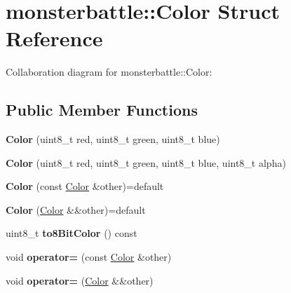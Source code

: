 \hypertarget{structmonsterbattle_1_1Color}{}\section{monsterbattle\+:\+:Color Struct Reference}
\label{structmonsterbattle_1_1Color}


Collaboration diagram for monsterbattle\+:\+:Color\+:
\subsection*{Public Member Functions}
\begin{DoxyCompactItemize}
\item 
\mbox{\label{structmonsterbattle_1_1Color_a99ad4b64f0358401ea1e0d097c207997}} 
{\bfseries Color} (uint8\+\_\+t red, uint8\+\_\+t green, uint8\+\_\+t blue)
\item 
\mbox{\label{structmonsterbattle_1_1Color_a1c13658e34dafb56224fdc52fdecee2e}} 
{\bfseries Color} (uint8\+\_\+t red, uint8\+\_\+t green, uint8\+\_\+t blue, uint8\+\_\+t alpha)
\item 
\mbox{\label{structmonsterbattle_1_1Color_a6c52ef2ce6b64dc2e0469ce631ef36b0}} 
{\bfseries Color} (const \hyperlink{structmonsterbattle_1_1Color}{Color} \&other)=default
\item 
\mbox{\label{structmonsterbattle_1_1Color_ac2b7881a6ee646779f5ff642659eb397}} 
{\bfseries Color} (\hyperlink{structmonsterbattle_1_1Color}{Color} \&\&other)=default
\item 
\mbox{\label{structmonsterbattle_1_1Color_a9d15d99f54c6c5566a5d605ad76c54ef}} 
uint8\+\_\+t {\bfseries to8\+Bit\+Color} () const
\item 
\mbox{\label{structmonsterbattle_1_1Color_ab5de28fa3da76ccb31207159364c4a43}} 
void {\bfseries operator=} (const \hyperlink{structmonsterbattle_1_1Color}{Color} \&other)
\item 
\mbox{\label{structmonsterbattle_1_1Color_aeefaf6430dfeac58613686335fe6aa25}} 
void {\bfseries operator=} (\hyperlink{structmonsterbattle_1_1Color}{Color} \&\&other)
\end{DoxyCompactItemize}
